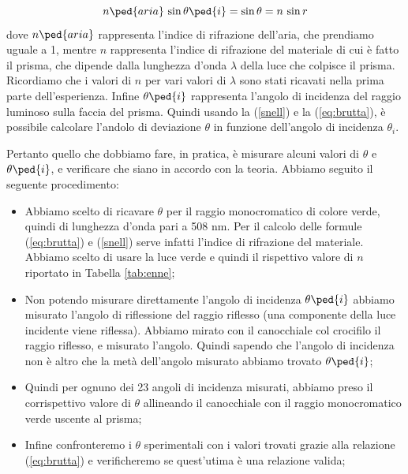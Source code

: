\begin{equation}
	 n\ped{aria} \, \sin{\theta\ped{i}} = \sin{\theta} = n \, \sin{r}
	 \label{snell}
\end{equation}
%
dove $n\ped{aria}$ rappresenta l'indice di rifrazione dell'aria, che prendiamo uguale a 1, mentre $n$ rappresenta l'indice di rifrazione del materiale di cui è fatto il prisma, che dipende dalla lunghezza d'onda $\lambda$ della luce che colpisce il prisma. Ricordiamo che i valori di $n$ per vari valori di $\lambda$ sono stati ricavati nella prima parte dell'esperienza. Infine $\theta\ped{i}$ rappresenta l'angolo di incidenza del raggio luminoso sulla faccia del prisma.
Quindi usando la (\ref{snell}) e la (\ref{eq:brutta}), è possibile calcolare l'andolo di deviazione $\theta$ in funzione dell'angolo di incidenza $\theta_i$.

Pertanto quello che dobbiamo fare, in pratica, è misurare alcuni valori di $\theta$ e $\theta\ped{i}$, e verificare che siano in accordo con la teoria. Abbiamo seguito il seguente procedimento:

\begin{itemize}
	\item{Abbiamo scelto di ricavare $\theta$ per il raggio monocromatico di colore verde, quindi di lunghezza d'onda pari a 508 nm. Per il calcolo delle formule (\ref{eq:brutta}) e (\ref{snell}) serve infatti l'indice di rifrazione del materiale. Abbiamo scelto di usare la luce verde e quindi il rispettivo valore di $n$ riportato in Tabella \ref{tab:enne};}
	\item{Non potendo misurare direttamente l'angolo di incidenza $\theta\ped{i}$ abbiamo misurato l'angolo di riflessione del raggio riflesso (una componente della luce incidente viene riflessa). Abbiamo mirato con il canocchiale col crocifilo il raggio riflesso, e misurato l'angolo. Quindi sapendo che l'angolo di incidenza non è altro che la metà dell'angolo misurato abbiamo trovato $\theta\ped{i}$;}
	\item{Quindi per ognuno dei 23 angoli di incidenza misurati, abbiamo preso il corrispettivo valore di $\theta$ allineando il canocchiale con il raggio monocromatico verde uscente al prisma;}
	\item{Infine confronteremo i $\theta$ sperimentali con i valori trovati grazie alla relazione (\ref{eq:brutta}) e verificheremo se quest'utima è una relazione valida;}
\end{itemize}

